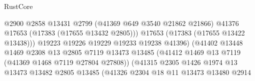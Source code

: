 \begin{lexlean}{RustCore}
\begin{coremodule}
                                                  @2900
                                                  @2858
                                                  @13431
                                                  @2799
                                                  (@41369 @649 @3540 @21862 @21866)
                                                  @41376
                                                  @17653
                                                  (@17383 (@17655 @13432 @2805)))
                                                @17653
                                                (@17383 (@17655 @13422 @13438)))
                                              @19223
                                              @19226
                                              @19229
                                              @19233
                                              @19238
                                              @41396)
                                            (@41402
                                              @13448
                                              @1469
                                              @2308
                                              @13
                                              @2805
                                              @7119
                                              @13473
                                              @13485
                                              (@41412
                                                @1469
                                                @13
                                                @7119
                                                (@41369 @1468 @7119 @27804 @27808))
                                              (@41315
                                                @2305
                                                @1426
                                                @1974
                                                @13
                                                @13473
                                                @13482
                                                @2805
                                                @13485
                                                (@41326
                                                  @2304
                                                  @18
                                                  @11
                                                  @13473
                                                  @13480
                                                  @2914

\end{coremodule}
\end{lexlean}
